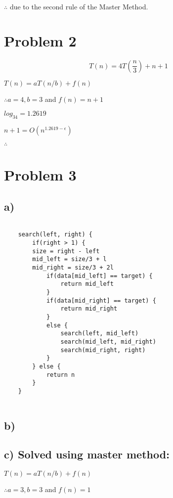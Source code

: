 \documentclass{article}
\begin{document}
$\therefore$  due to the second rule of the Master Method.

\section*{Problem 2}

\[T(n) = 4T(\frac{n}{3}) + n + 1\]

$T(n) = aT(n/b) + f(n)$

$\therefore a = 4, b = 3$ and $f(n) = n + 1$

$log_34 = 1.2619$

$n + 1 = O(n^{1.2619 - \epsilon})$

$\therefore$ 

\section*{Problem 3}

\subsection*{a)}

\begin{verbatim}

    search(left, right) {
        if(right > 1) {
        size = right - left
        mid_left = size/3 + l
        mid_right = size/3 + 2l
            if(data[mid_left] == target) {
                return mid_left
            }
            if(data[mid_right] == target) {
                return mid_right
            }
            else {
                search(left, mid_left)
                search(mid_left, mid_right)
                search(mid_right, right)
            }
        } else {
            return n
        }
    }
    
\end{verbatim}

\subsection*{b) }

\subsection*{c) Solved using master method:}

$T(n) = aT(n/b) + f(n)$

$\therefore a = 3, b = 3$ and $f(n) = 1$
\end{document}
